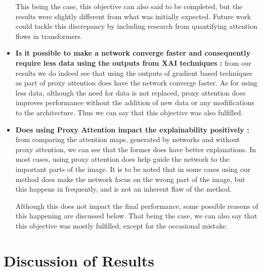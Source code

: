 \begin{itemize}
This being the case, this objective can also said to be completed, but the results were slightly different from what was initially expected. Future work could tackle this discrepancy by including research from quantifying attention flows in transformers. \cite{abnarQuantifyingAttentionFlow2020}
\item \textbf{Is it possible to make a network converge faster and consequently require less data using the outputs from XAI techniques :} from our results we do indeed see that using the outputs of gradient based techniques as part of proxy attention does have the network converge faster. As for using less data, although the need for data is not replaced, proxy attention does improves performance without the addition of new data or any modifications to the architecture. Thus we can say that this objective was also fulfilled.
\item \textbf{Does using Proxy Attention impact the explainability positively :} from comparing the attention maps, generated by networks and without proxy attention, we can see that the former does have better explanations. In most cases, using proxy attention does help guide the network to the important parts of the image. It is to be noted that in some cases using our method does make the network focus on the wrong part of the image, but this happens in frequently, and is not an inherent flaw of the method.

Although this does not impact the final performance, some possible reasons of this happening are discussed below. That being the case, we can also say that this objective was mostly fulfilled, except for the occasional mistake.
\end{itemize}


\section{Discussion of Results}

